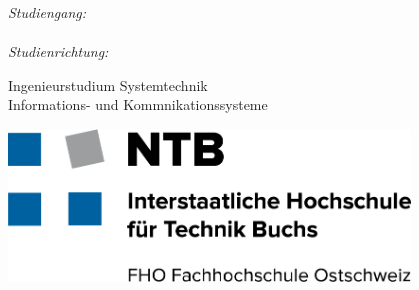 \begin{titlepage}


\begin{minipage}[t]{0.2\textwidth}
	\begin{flushleft}
		\textit{Studiengang:} \\
		\mbox{} \\
		\textit{Studienrichtung:}
	\end{flushleft}
\end{minipage}
\begin{minipage}[t]{0.3\textwidth} %
	\begin{flushleft}
		Ingenieurstudium Systemtechnik \\
		Informations- und Kommnikationssysteme
	\end{flushleft}
\end{minipage}
\begin{minipage}[t]{0.5\textwidth}
	\begin{flushright}
		\vspace{-3mm}
		\includegraphics[width=0.8\textwidth]{img/logo_ntb.png}
	\end{flushright}
\end{minipage}





\end{titlepage}
